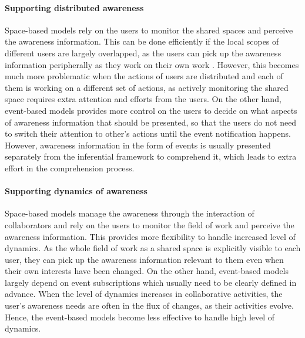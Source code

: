 \paragraph*{Supporting distributed awareness} %
\label{par:supporting_distributed_awareness}
Space-based models rely on the users to monitor the shared spaces and perceive the awareness information. This can be done efficiently if the local scopes of different users are largely overlapped, as the users can pick up the awareness information peripherally as they work on their own work \cite{schmidt2002a}. However, this becomes much more problematic when the actions of users are distributed and each of them is working on a different set of actions, as actively monitoring the shared space requires extra attention and efforts from the users. On the other hand, event-based models provides more control on the users to decide on what aspects of awareness information that should be presented, so that the users do not need to switch their attention to other's actions until the event notification happens. However, awareness information in the form of events is usually presented separately from the inferential framework to comprehend it, which leads to extra effort in the comprehension process.

\paragraph*{Supporting dynamics of awareness} %
\label{par:supporting_dynamics_of_awareness}
Space-based models manage the awareness through the interaction of collaborators and rely on the users to monitor the field of work and perceive the awareness information. This provides more flexibility to handle increased level of dynamics. As the whole field of work as a shared space is explicitly visible to each user, they can pick up the awareness information relevant to them even when their own interests have been changed. On the other hand, event-based models largely depend on event subscriptions which usually need to be clearly defined in advance. When the level of dynamics increases in collaborative activities, the user's awareness needs are often in the flux of changes, as their activities evolve. Hence, the event-based models become less effective to handle high level of dynamics.

